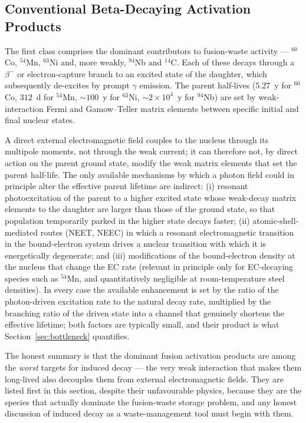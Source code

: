 \documentclass[conference]{IEEEtran}
\begin{document}
\subsection{Conventional Beta-Decaying Activation Products}
The first class comprises the dominant contributors to fusion-waste activity --- $^{60}$Co, $^{54}$Mn, $^{63}$Ni and, more weakly, $^{94}$Nb and $^{14}$C. Each of these decays through a $\beta^-$ or electron-capture branch to an excited state of the daughter, which subsequently de-excites by prompt $\gamma$ emission. The parent half-lives ($5.27$~y for $^{60}$Co, $312$~d for $^{54}$Mn, $\sim 100$~y for $^{63}$Ni, $\sim 2 \times 10^{4}$~y for $^{94}$Nb) are set by weak-interaction Fermi and Gamow--Teller matrix elements between specific initial and final nuclear states.

A direct external electromagnetic field couples to the nucleus through its multipole moments, not through the weak current; it can therefore not, by direct action on the parent ground state, modify the weak matrix elements that set the parent half-life. The only available mechanisms by which a photon field could in principle alter the effective parent lifetime are indirect: (i) resonant photoexcitation of the parent to a higher excited state whose weak-decay matrix elements to the daughter are larger than those of the ground state, so that population temporarily parked in the higher state decays faster; (ii) atomic-shell-mediated routes (NEET, NEEC) in which a resonant electromagnetic transition in the bound-electron system drives a nuclear transition with which it is energetically degenerate; and (iii) modifications of the bound-electron density at the nucleus that change the EC rate (relevant in principle only for EC-decaying species such as $^{54}$Mn, and quantitatively negligible at room-temperature steel densities). In every case the available enhancement is set by the ratio of the photon-driven excitation rate to the natural decay rate, multiplied by the branching ratio of the driven state into a channel that genuinely shortens the effective lifetime; both factors are typically small, and their product is what Section~\ref{sec:bottleneck} quantifies.

The honest summary is that the dominant fusion activation products are among the \emph{worst} targets for induced decay --- the very weak interaction that makes them long-lived also decouples them from external electromagnetic fields. They are listed first in this section, despite their unfavourable physics, because they are the species that actually dominate the fusion-waste storage problem, and any honest discussion of induced decay as a waste-management tool must begin with them.
\end{document}

